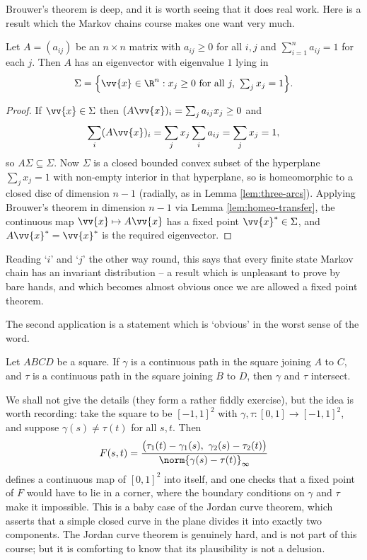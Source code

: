 Brouwer's theorem is deep, and it is worth seeing that it does real work. Here is a result which the Markov chains course makes one want very much.

\begin{proposition}\label{prop:perron}
	Let $A = (a_{ij})$ be an $n\times n$ matrix with $a_{ij}\geq 0$ for all $i,j$ and $\sum_{i=1}^n a_{ij} = 1$ for each $j$. Then $A$ has an eigenvector with eigenvalue $1$ lying in
	$$\Sigma = \Big\{\vv{x} \in \R^n : x_j \geq 0 \text{ for all } j, \ \textstyle\sum_j x_j = 1\Big\}.$$
\end{proposition}

\begin{proof}
	If $\vv{x} \in \Sigma$ then $(A\vv{x})_i = \sum_j a_{ij}x_j \geq 0$ and
	$$\sum_i (A\vv{x})_i = \sum_j x_j \sum_i a_{ij} = \sum_j x_j = 1,$$
	so $A\Sigma \subseteq \Sigma$. Now $\Sigma$ is a closed bounded convex subset of the hyperplane $\sum_j x_j = 1$ with non-empty interior in that hyperplane, so is homeomorphic to a closed disc of dimension $n-1$ (radially, as in Lemma \ref{lem:three-arcs}). Applying Brouwer's theorem in dimension $n-1$ via Lemma \ref{lem:homeo-transfer}, the continuous map $\vv{x}\mapsto A\vv{x}$ has a fixed point $\vv{x}^* \in \Sigma$, and $A\vv{x}^* = \vv{x}^*$ is the required eigenvector.
\end{proof}

Reading `$i$' and `$j$' the other way round, this says that every finite state Markov chain has an invariant distribution -- a result which is unpleasant to prove by bare hands, and which becomes almost obvious once we are allowed a fixed point theorem.

The second application is a statement which is `obvious' in the worst sense of the word.

\begin{proposition}\label{prop:crossing}
	Let $ABCD$ be a square. If $\gamma$ is a continuous path in the square joining $A$ to $C$, and $\tau$ is a continuous path in the square joining $B$ to $D$, then $\gamma$ and $\tau$ intersect.
\end{proposition}

We shall not give the details (they form a rather fiddly exercise), but the idea is worth recording: take the square to be $[-1,1]^2$ with $\gamma, \tau : [0,1] \to [-1,1]^2$, and suppose $\gamma(s) \neq \tau(t)$ for all $s,t$. Then
$$F(s,t) = \frac{\big(\tau_1(t)-\gamma_1(s),\ \gamma_2(s)-\tau_2(t)\big)}{\norm{\gamma(s)-\tau(t)}_\infty}$$
defines a continuous map of $[0,1]^2$ into itself, and one checks that a fixed point of $F$ would have to lie in a corner, where the boundary conditions on $\gamma$ and $\tau$ make it impossible. This is a baby case of the Jordan curve theorem, which asserts that a simple closed curve in the plane divides it into exactly two components. The Jordan curve theorem is genuinely hard, and is not part of this course; but it is comforting to know that its plausibility is not a delusion.

